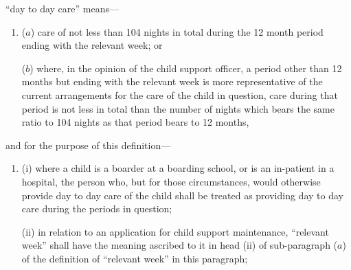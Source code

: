 \documentclass[a4paper]{article}
\begin{document}
\begin{enumerate}
%

“day to day care” means—
\begin{enumerate}\item[]
($a$) care of not less than 104 nights in total during the 12 month period ending with the relevant week; or

($b$) where, in the opinion of the child support officer, a period other than 12 months but ending with the relevant week is more representative of the current arrangements for the care of the child in question, care during that period is not less in total than the number of nights which bears the same ratio to 104 nights as that period bears to 12 months,
\end{enumerate}
and for the purpose of this definition—
\begin{enumerate}\item[]
(i) where a child is a boarder at a boarding school, or is an in-patient in a hospital, the person who, but for those circumstances, would otherwise provide day to day care of the child shall be treated as providing day to day care during the periods in question;


(ii) in relation to an application for child support maintenance, “relevant week” shall have the meaning ascribed to it in head (ii) of sub-paragraph ($a$) of the definition of “relevant week” in this paragraph;


\end{enumerate}
\end{enumerate}
\end{document}

